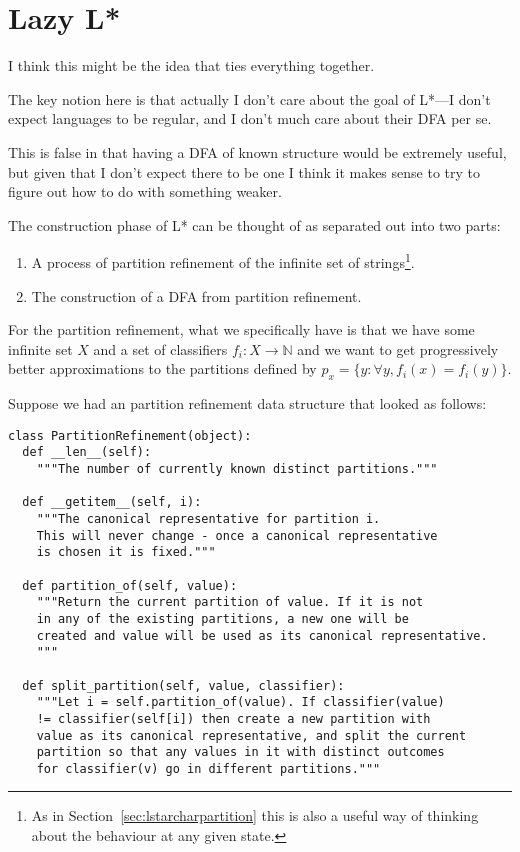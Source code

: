\documentclass[a4paper]{book}
\begin{document}
\section{Lazy L*}

I think this might be the idea that ties everything together.

The key notion here is that actually I don't care about the goal of L*---I
don't expect languages to be regular,
and I don't much care about their DFA per se.

This is false in that having a DFA of known structure would be extremely useful,
but given that I don't expect there to be one I think it makes sense to try to figure out how to do with something weaker.

The construction phase of L* can be thought of as separated out into two parts:

\begin{enumerate}
\item A process of partition refinement of the infinite set of strings\footnote{
As in Section~\ref{sec:lstarcharpartition} this is also a useful way of thinking about the behaviour at any given state.
}.
\item The construction of a DFA from partition refinement.
\end{enumerate}

For the partition refinement,
what we specifically have is that we have some infinite set \(X\) and a set of classifiers \(f_i: X \to \mathbb{N}\) and we want to get progressively better approximations to the partitions defined by \(p_x = \{y: \forall y, f_i(x) = f_i(y)\}\).

Suppose we had an partition refinement data structure that looked as follows:

\begin{lstlisting}
class PartitionRefinement(object):
  def __len__(self):
    """The number of currently known distinct partitions."""

  def __getitem__(self, i):
    """The canonical representative for partition i.
    This will never change - once a canonical representative
    is chosen it is fixed."""

  def partition_of(self, value):
    """Return the current partition of value. If it is not
    in any of the existing partitions, a new one will be
    created and value will be used as its canonical representative.
    """

  def split_partition(self, value, classifier):
    """Let i = self.partition_of(value). If classifier(value)
    != classifier(self[i]) then create a new partition with
    value as its canonical representative, and split the current
    partition so that any values in it with distinct outcomes
    for classifier(v) go in different partitions."""
\end{lstlisting}
\end{document}
